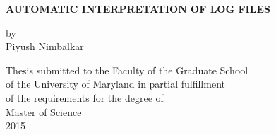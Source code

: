 \begin{titlepage}
\mbox{}\vspace{1in}
\begin{center}

    {\Large \bf AUTOMATIC INTERPRETATION OF LOG FILES \par}
    
\vspace{1.9in}

    {\large by} \\
    {\large Piyush Nimbalkar }
    
\vspace{1.9in}

  \begin{singlespace}
    Thesis submitted to the Faculty of the Graduate School \\
    of the University of Maryland in partial fulfillment \\
    of the requirements for the degree of \\
    Master of Science \\
    2015
	\end{singlespace}
\end{center}
\end{titlepage}
